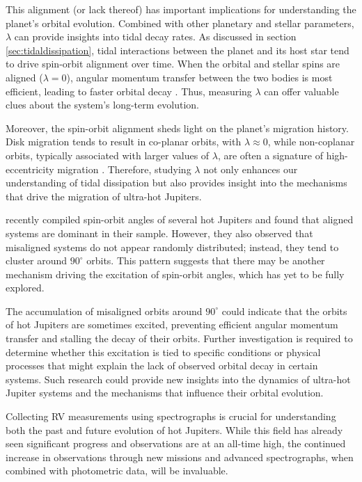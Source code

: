 \documentclass[oneside,12pt]{amsart}
\numberwithin{page}{section}
\begin{document}
This alignment (or lack thereof) has important implications for understanding the planet's orbital evolution. Combined with other planetary and stellar parameters, $\lambda$ can provide insights into tidal decay rates. As discussed in section \ref{sec:tidaldissipation}, tidal interactions between the planet and its host star tend to drive spin-orbit alignment over time. When the orbital and stellar spins are aligned ($\lambda = 0$), angular momentum transfer between the two bodies is most efficient, leading to faster orbital decay \citep{ogilvie2014tidal}. Thus, measuring $\lambda$ can offer valuable clues about the system’s long-term evolution.

Moreover, the spin-orbit alignment sheds light on the planet's migration history. Disk migration tends to result in co-planar orbits, with $\lambda \approx 0$, while non-coplanar orbits, typically associated with larger values of $\lambda$, are often a signature of high-eccentricity migration \citep{triaud2017rossiter}. Therefore, studying $\lambda$ not only enhances our understanding of tidal dissipation but also provides insight into the mechanisms that drive the migration of ultra-hot Jupiters.

\citet{attia2023dream} recently compiled spin-orbit angles of several hot Jupiters and found that aligned systems are dominant in their sample. However, they also observed that misaligned systems do not appear randomly distributed; instead, they tend to cluster around $90^\circ$ orbits. This pattern suggests that there may be another mechanism driving the excitation of spin-orbit angles, which has yet to be fully explored. 

The accumulation of misaligned orbits around $90^\circ$ could indicate that the orbits of hot Jupiters are sometimes excited, preventing efficient angular momentum transfer and stalling the decay of their orbits. Further investigation is required to determine whether this excitation is tied to specific conditions or physical processes that might explain the lack of observed orbital decay in certain systems. Such research could provide new insights into the dynamics of ultra-hot Jupiter systems and the mechanisms that influence their orbital evolution.

Collecting RV measurements using spectrographs is crucial for understanding both the past and future evolution of hot Jupiters. While this field has already seen significant progress and observations are at an all-time high, the continued increase in observations through new missions and advanced spectrographs, when combined with photometric data, will be invaluable.
\end{document}
